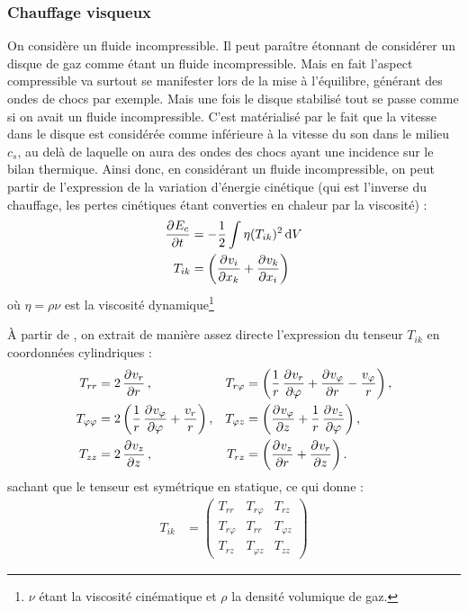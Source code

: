 
\subsubsection{Chauffage visqueux}
On considère un fluide incompressible. Il peut paraître étonnant de considérer un disque de gaz comme étant un fluide incompressible. Mais en fait l'aspect compressible va surtout se manifester lors de la mise à l'équilibre, générant des ondes de chocs par exemple. Mais une fois le disque stabilisé tout se passe comme si on avait un fluide incompressible. C'est matérialisé par le fait que la vitesse dans le disque est considérée comme inférieure à la vitesse du son dans le milieu $c_s$, au delà de laquelle on aura des ondes des chocs ayant une incidence sur le bilan thermique. Ainsi donc, en considérant un fluide incompressible, on peut partir de l'expression de la variation d'énergie cinétique (qui est l'inverse du chauffage, les pertes cinétiques étant converties en chaleur par la viscosité) \citep[(16.3)]{landau1989mecanique} : 
\begin{align}
\dpd{E_c}{t} &= - \frac{1}{2}\int \eta(T_{ik})^2\dif V\\
T_{ik} &= \left(\dpd{v_i}{x_k} + \dpd{v_k}{x_i}\right)\nonumber
\end{align}
où $\eta = \rho\nu$ est la viscosité dynamique\footnote{$\nu$ étant la viscosité cinématique et $\rho$ la densité volumique de gaz.}

À partir de \citep[(15.8) et (15.17)]{landau1989mecanique}, on extrait de manière assez directe l'expression du tenseur $T_{ik}$ en coordonnées cylindriques : 
\begin{align}
T_{rr} &= 2\dpd{v_r}{r}, & T_{r\varphi} &= \left(\inv{r} \dpd{v_r}{\varphi} + \dpd{v_\varphi}{r} - \frac{v_\varphi}{r}\right),\nonumber\\
T_{\varphi\varphi} &= 2 \left(\inv{r} \dpd{v_\varphi}{\varphi} + \frac{v_r}{r}\right), & T_{\varphi z} &= \left(\dpd{v_\varphi}{z} + \inv{r}\dpd{v_z}{\varphi}\right),\\
T_{zz} &= 2\dpd{v_z}{z}, & T_{rz} &= \left(\dpd{v_z}{r} + \dpd{v_r}{z}\right).\nonumber
\end{align}
sachant que le tenseur est symétrique en statique, ce qui donne : 
\begin{align}
T_{ik} &= \begin{pmatrix}
T_{rr} & T_{r\varphi} & T_{rz}\\
T_{r\varphi} & T_{rr} & T_{\varphi z}\\
T_{rz} & T_{\varphi z} & T_{zz}
\end{pmatrix}
\end{align}

